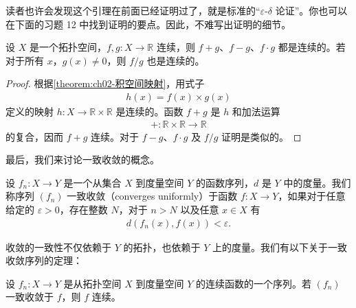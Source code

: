 \documentclass[../../main.tex]{subfiles}
\begin{document}
读者也许会发现这个引理在前面已经证明过了，就是标准的“$\varepsilon$-$\delta$ 论证”。你也可以在下面的习题 12 中找到证明的要点。因此，不难写出证明的细节。

\begin{theorem}[连续实值函数的运算]\label{theorem:ch02-实值函数运算}
设 $X$ 是一个拓扑空间，$f, g: X \rightarrow \mathbb{R}$ 连续，则 $f + g$、$f - g$、$f \cdot g$ 都是连续的。若对于所有 $x$，$g(x) \neq 0$，则 $f/g$ 也是连续的。
\end{theorem}

\begin{proof}
根据\cref{theorem:ch02-积空间映射}，用式子
\begin{align*}
h(x) = f(x) \times g(x)
\end{align*}
定义的映射 $h: X \rightarrow \mathbb{R} \times \mathbb{R}$ 是连续的。函数 $f + g$ 是 $h$ 和加法运算
\begin{align*}
+: \mathbb{R} \times \mathbb{R} \longrightarrow \mathbb{R}
\end{align*}
的复合，因而 $f + g$ 连续。对于 $f - g$、$f \cdot g$ 及 $f/g$ 证明是类似的。
\end{proof}

最后，我们来讨论一致收敛的概念。

\begin{definition}[一致收敛]\label{definition:ch02-一致收敛}
设 $f_{n}: X \rightarrow Y$ 是一个从集合 $X$ 到度量空间 $Y$ 的函数序列，$d$ 是 $Y$ 中的度量。我们称序列 $(f_{n})$ 一致收敛（converges uniformly）于函数 $f: X \rightarrow Y$，如果对于任意给定的 $\varepsilon > 0$，存在整数 $N$，对于 $n > N$ 以及任意 $x \in X$ 有
\begin{align*}
d(f_{n}(x), f(x)) < \varepsilon.
\end{align*}
\end{definition}

收敛的一致性不仅依赖于 $Y$ 的拓扑，也依赖于 $Y$ 上的度量。我们有以下关于一致收敛序列的定理：

\begin{theorem}[一致极限定理]\label{theorem:ch02-一致极限定理}
设 $f_{n}: X \rightarrow Y$ 是从拓扑空间 $X$ 到度量空间 $Y$ 的连续函数的一个序列。若 $(f_{n})$ 一致收敛于 $f$，则 $f$ 连续。
\end{theorem}
\end{document}
